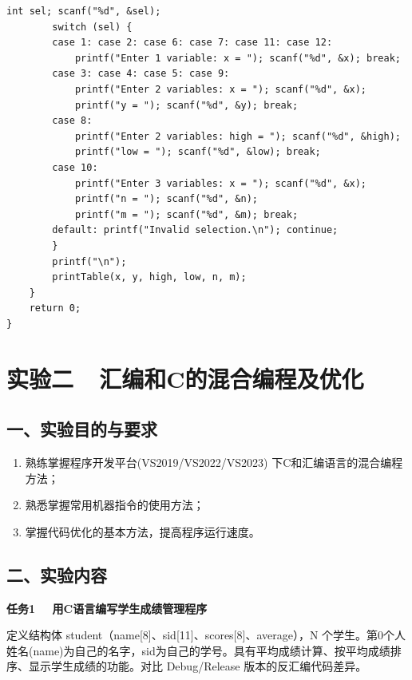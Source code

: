 \begin{lstlisting}[basicstyle=\ttfamily\zihao{5},lineskip=-1pt]
        int sel; scanf("%d", &sel);
        switch (sel) {
        case 1: case 2: case 6: case 7: case 11: case 12:
            printf("Enter 1 variable: x = "); scanf("%d", &x); break;
        case 3: case 4: case 5: case 9:
            printf("Enter 2 variables: x = "); scanf("%d", &x);
            printf("y = "); scanf("%d", &y); break;
        case 8:
            printf("Enter 2 variables: high = "); scanf("%d", &high);
            printf("low = "); scanf("%d", &low); break;
        case 10:
            printf("Enter 3 variables: x = "); scanf("%d", &x);
            printf("n = "); scanf("%d", &n);
            printf("m = "); scanf("%d", &m); break;
        default: printf("Invalid selection.\n"); continue;
        }
        printf("\n");
        printTable(x, y, high, low, n, m);
    }
    return 0;
}
\end{lstlisting}

\newpage

\section*{实验二\ \ 汇编和C的混合编程及优化}

\subsection*{一、实验目的与要求}

\begin{enumerate}[label=（\arabic*）,nosep,leftmargin=*]
    \item 熟练掌握程序开发平台(VS2019/VS2022/VS2023) 下C和汇编语言的混合编程方法；
    \item 熟悉掌握常用机器指令的使用方法；
    \item 掌握代码优化的基本方法，提高程序运行速度。
\end{enumerate}

\subsection*{二、实验内容}

\textbf{任务1 \ \ 用C语言编写学生成绩管理程序}

定义结构体 student（name[8]、sid[11]、scores[8]、average），N 个学生。第0个人姓名(name)为自己的名字，sid为自己的学号。具有平均成绩计算、按平均成绩排序、显示学生成绩的功能。对比 Debug/Release 版本的反汇编代码差异。

